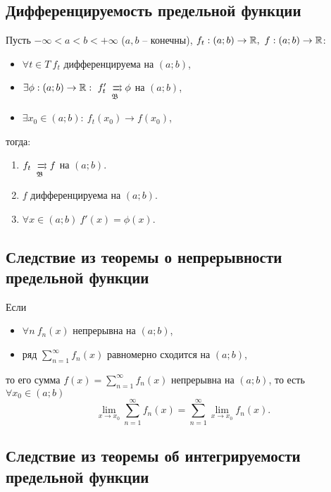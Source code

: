 \newpage

\subsection{Дифференцируемость предельной функции}

\begin{theorem}\label{theorem:6.9.5}
    Пусть $ -\infty < a < b < +\infty $ ($ a,b $ -- конечны), $ f_t: (a;b)\rightarrow\R, \ f:(a;b) \rightarrow \R $:
    \begin{itemize}
        \item $ \forall t \in T \ f_t $ дифференцируема на $ (a;b) $,
        \item $ \exists \phi: (a;b)\rightarrow\R: \ f_t' \xrightrightarrows[\mathfrak{B}]{} \phi $ на $ (a;b) $,
        \item $ \exists x_0 \in (a;b): \ f_t(x_0) \rightarrow f(x_0) $,
    \end{itemize}
    тогда:
    \begin{enumerate}
        \item $ f_t \xrightrightarrows[\mathfrak{B}]{} f $ на $ (a;b) $.
        \item $ f $ дифференцируема на $ (a;b) $.
        \item $ \forall x \in (a;b) \ f'(x) = \phi(x) $.
    \end{enumerate}
\end{theorem}

\subsection{Следствие из теоремы о непрерывности предельной функции}

\begin{corollary}
    Если
    \begin{itemize}
        \item $\forall n \ f_n(x)$ непрерывна на $(a;b)$,
        \item ряд $\sum_{n = 1}^{\infty} f_n(x)$ равномерно сходится на $(a;b)$,
    \end{itemize}
    то его сумма $f(x) = \sum_{n=1}^{\infty}f_n(x)$ непрерывна на $(a;b)$, то есть $\forall x_0 \in (a;b)$
    \[
        \underset{x\rightarrow x_0}{\lim}\sum_{n=1}^{\infty}f_n(x) = \sum_{n=1}^{\infty}\underset{x\rightarrow x_0}{\lim}f_n(x).
    \]
\end{corollary}

\subsection{Следствие из теоремы об интегрируемости предельной функции}

